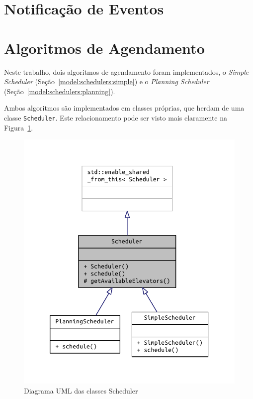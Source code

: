 \section{\label{model:notification}Notificação de Eventos}
\lipsum[3]

\section{\label{model:schedulers}Algoritmos de Agendamento}
Neste trabalho, dois algoritmos de agendamento foram implementados, o
\textit{Simple Scheduler} (Seção~\ref{model:schedulers:simple}) e o
\textit{Planning Scheduler} (Seção~\ref{model:schedulers:planning}).

Ambos algoritmos são implementados em classes próprias, que herdam de uma classe
\texttt{Scheduler}. Este relacionamento pode ser visto mais claramente na
Figura~\ref{fig:model:schedulers:uml:base}.

\begin{figure}[htb]
  \centering
  \includegraphics{doc/latex/class_scheduler__inherit__graph}
  \caption{Diagrama UML das classes Scheduler}
  \label{fig:model:schedulers:uml:base}
\end{figure}

